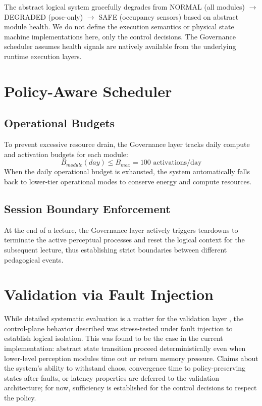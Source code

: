 \documentclass[conference]{IEEEtran}
\begin{document}
The abstract logical system gracefully degrades from NORMAL (all modules) $\to$ DEGRADED (pose-only) $\to$ SAFE (occupancy sensors) based on abstract module health. We do not define the execution semantics or physical state machine implementations here, only the control decisions. The Governance scheduler assumes health signals are natively available from the underlying runtime execution layers.

\section{Policy-Aware Scheduler}

\subsection{Operational Budgets}
To prevent excessive resource drain, the Governance layer tracks daily compute and activation budgets for each module:
\begin{equation}
B_{module}(day) \leq B_{max} = 100 \text{ activations/day}
\end{equation}
When the daily operational budget is exhausted, the system automatically falls back to lower-tier operational modes to conserve energy and compute resources.

\subsection{Session Boundary Enforcement}
At the end of a lecture, the Governance layer actively triggers teardowns to terminate the active perceptual processes and reset the logical context for the subsequent lecture, thus establishing strict boundaries between different pedagogical events.

\section{Validation via Fault Injection}

While detailed systematic evaluation is a matter for the validation layer \cite{b28}, the control-plane behavior described was stress-tested under fault injection to establish logical isolation. This was found to be the case in the current implementation: abstract state transition proceed deterministically even when lower-level perception modules time out or return memory pressure. Claims about the system’s ability to withstand chaos, convergence time to policy-preserving states after faults, or latency properties are deferred to the validation architecture; for now, sufficiency is established for the control decisions to respect the policy.
\end{document}
